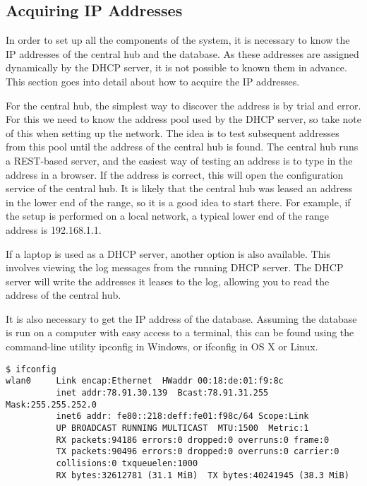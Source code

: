 \documentclass[../document.tex]{subfiles}
\begin{document}
\subsection{Acquiring IP Addresses}
In order to set up all the components of the system, it is necessary to know the IP addresses of the central hub and the database. As these addresses are assigned dynamically by the DHCP server, it is not possible to known them in advance. This section goes into detail about how to acquire the IP addresses.

For the central hub, the simplest way to discover the address is by trial and error. For this we need to know the address pool used by the DHCP server, so take note of this when setting up the network. The idea is to test subsequent addresses from this pool until the address of the central hub is found. The central hub runs a \gls{REST}-based server, and the easiest way of testing an address is to type in the address in a browser. If the address is correct, this will open the configuration service of the central hub. It is likely that the central hub was leased an address in the lower end of the range, so it is a good idea to start there. For example, if the setup is performed on a local network, a typical lower end of the range address is 192.168.1.1.

If a laptop is used as a DHCP server, another option is also available. This involves viewing the log messages from the running DHCP server. The DHCP server will write the addresses it leases to the log, allowing you to read the address of the central hub.

It is also necessary to get the IP address of the database. Assuming the database is run on a computer with easy access to a terminal, this can be found using the command-line utility ipconfig in Windows, or ifconfig in OS X or Linux.
\lstset{style=custombash}
\begin{lstlisting}[caption=Example output of the ifconfig command in Linux]
$ ifconfig
wlan0     Link encap:Ethernet  HWaddr 00:18:de:01:f9:8c  
          inet addr:78.91.30.139  Bcast:78.91.31.255  Mask:255.255.252.0
          inet6 addr: fe80::218:deff:fe01:f98c/64 Scope:Link
          UP BROADCAST RUNNING MULTICAST  MTU:1500  Metric:1
          RX packets:94186 errors:0 dropped:0 overruns:0 frame:0
          TX packets:90496 errors:0 dropped:0 overruns:0 carrier:0
          collisions:0 txqueuelen:1000 
          RX bytes:32612781 (31.1 MiB)  TX bytes:40241945 (38.3 MiB)
\end{lstlisting}
\end{document}
